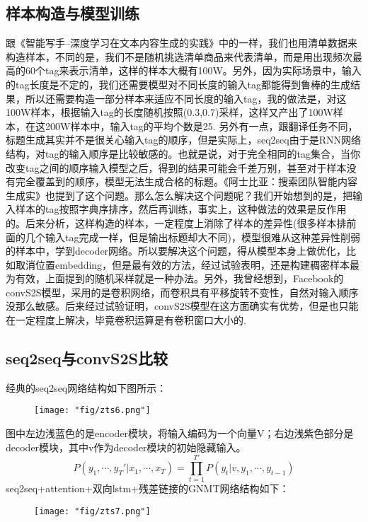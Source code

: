 \subsection{样本构造与模型训练}
跟《智能写手--深度学习在文本内容生成的实践》中的一样，我们也用清单数据来构造样本，不同的是，我们不是随机挑选清单商品来代表清单，而是用出现频次最高的60个tag来表示清单，这样的样本大概有100W。另外，因为实际场景中，输入的tag长度是不定的，我们还需要模型对不同长度的输入tag都能得到鲁棒的生成结果，所以还需要构造一部分样本来适应不同长度的输入tag，我的做法是，对这100W样本，根据输入tag的长度随机按照(0.3,0.7)采样，这样又产出了100W样本，在这200W样本中，输入tag的平均个数是25.
另外有一点，跟翻译任务不同，标题生成其实并不是很关心输入tag的顺序，但是实际上，seq2seq由于是RNN网络结构，对tag的输入顺序是比较敏感的。也就是说，对于完全相同的tag集合，当你改变tag之间的顺序输入模型之后，得到的结果可能会千差万别，甚至对于样本没有完全覆盖到的顺序，模型无法生成合格的标题。《阿士比亚：搜索团队智能内容生成实》也提到了这个问题。那么怎么解决这个问题呢？我们开始想到的是，把输入样本的tag按照字典序排序，然后再训练，事实上，这种做法的效果是反作用的。后来分析，这样构造的样本，一定程度上消除了样本的差异性(很多样本排前面的几个输入tag完成一样，但是输出标题却大不同)，模型很难从这种差异性削弱的样本中，学到decoder网络。所以要解决这个问题，得从模型本身上做优化，比如取消位置embedding，但是最有效的方法，经过试验表明，还是构建稠密样本最为有效，上面提到的随机采样就是一种办法。另外，我曾经想到，Facebook的convS2S模型，采用的是卷积网络，而卷积具有平移旋转不变性，自然对输入顺序没那么敏感。后来经过试验证明，convS2S模型在这方面确实有优势，但是也只能在一定程度上解决，毕竟卷积运算是有卷积窗口大小的.

\subsection{seq2seq与convS2S比较}
经典的seq2seq网络结构如下图所示：
\begin{figure}[!h]
	\centering
	\texttt{[image: "fig/zts6.png"]}
	\caption{}
	\label{fig:zts6}
\end{figure}

图中左边浅蓝色的是encoder模块，将输入编码为一个向量V；右边浅紫色部分是decoder模块，其中v作为decoder模块的初始隐藏输入。
\begin{equation}
P(y_1,\cdots,y_T'|x_1,\cdots,x_T)  = \prod_{t=1}^{T'}{P(y_t|v,y_1,\cdots,y_{t-1})}
\end{equation} 
seq2seq+attention+双向lstm+残差链接的GNMT网络结构如下：
\begin{figure}[!h]
	\centering
	\texttt{[image: "fig/zts7.png"]}
	\caption{}
	\label{fig:zts7}
\end{figure}

